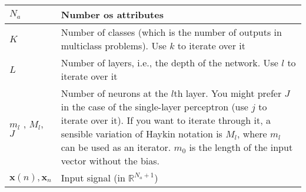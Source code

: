 \begin{xltabular}{\textwidth}{XX}
	\(N_a\)                                                                                                                                                                        & Number os attributes                                                                                                                                                                                                                                                                                                                   \\ \hline
	\(K\) \cite{bishopPatternRecognitionMachine2006}                                                                                                                               & Number of classes (which is the number of outputs in multiclass problems). Use \(k\) to iterate over it                                                                                                                                                                                                                                \\ \hline
	\(L\)                                                                                                                                                                          & Number of layers, i.e., the depth of the network. Use \(l\) to iterate over it                                                                                                                                                                                                                                                                                         \\ \hline
	\(m_l\) \cite{bishopPatternRecognitionMachine2006}, \(M_l\), \(J\) \cite{bishopPatternRecognitionMachine2006}                                                                  & Number of neurons at the \(l\)th layer. You might prefer \(J\) in the case of the single-layer perceptron (use \(j\) to iterate over it). If you want to iterate through it, a sensible variation of Haykin notation is \(M_l\), where \(m_l\) can be used as an iterator. \(m_0\) is the length of the input vector without the bias. \\ \hline
	\(\mathbf{x}(n), \mathbf{x}_n\)                                                                                                                                                & Input signal (in \(\mathbb{R}^{N_a + 1}\))                                                                                                                                                                                                                                                                                             \\ \hline

\end{xltabular}
